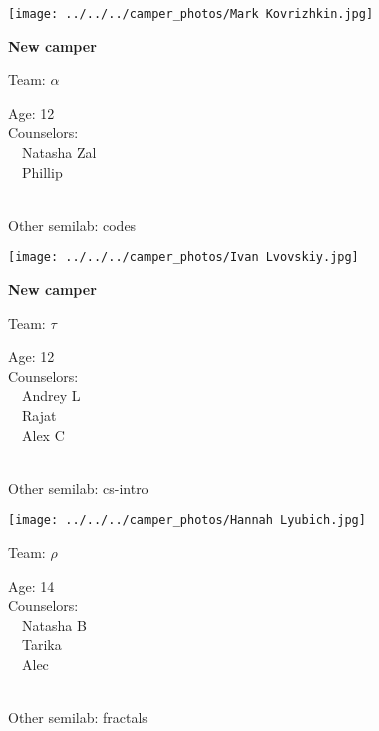 \documentclass[10pt,letterpaper, landscape]{article}
\begin{document}
\horizontalshiftfornextsticker
\renewcommand{\baselinestretch}{1} \begin{sticker}
\noindent\begin{minipage}{0.5\textwidth}\texttt{[image: ../../../camper\_photos/Mark Kovrizhkin.jpg]}\end{minipage}\begin{minipage}{0.45\textwidth}
\textbf{New camper} 

Team: {\Large $\alpha$}

Age:        12\\
Counselors: \\\ \ Natasha Zal\\\ \ Phillip\\
\end{minipage} \\ \vspace{0.07in}
Other semilab: codes
\end{sticker}
\verticalshiftfornextsticker
\renewcommand{\baselinestretch}{1} \begin{sticker}
\noindent\begin{minipage}{0.5\textwidth}\texttt{[image: ../../../camper\_photos/Ivan Lvovskiy.jpg]}\end{minipage}\begin{minipage}{0.45\textwidth}
\textbf{New camper} 

Team: {\Large $\tau$}

Age:        12\\
Counselors: \\\ \ Andrey L\\\ \ Rajat\\\ \ Alex C\\
\end{minipage} \\ \vspace{0.07in}
Other semilab: cs-intro
\end{sticker}
\horizontalshiftfornextsticker
\renewcommand{\baselinestretch}{1} \begin{sticker}
\noindent\begin{minipage}{0.5\textwidth}\texttt{[image: ../../../camper\_photos/Hannah Lyubich.jpg]}\end{minipage}\begin{minipage}{0.45\textwidth}
Team: {\Large $\rho$}

Age:        14\\
Counselors: \\\ \ Natasha B\\\ \ Tarika\\\ \ Alec\\
\end{minipage} \\ \vspace{0.07in}
Other semilab: fractals
\end{sticker}
\end{document}
